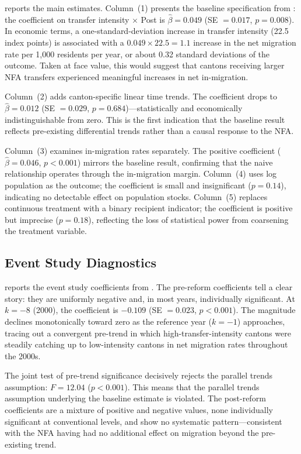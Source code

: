 \documentclass[12pt]{article}
\begin{document}
 reports the main estimates. Column~(1) presents the baseline specification from : the coefficient on transfer intensity $\times$ Post is $\hat{\beta} = 0.049$ (SE $= 0.017$, $p = 0.008$). In economic terms, a one-standard-deviation increase in transfer intensity (22.5 index points) is associated with a $0.049 \times 22.5 = 1.1$ increase in the net migration rate per 1,000 residents per year, or about 0.32 standard deviations of the outcome. Taken at face value, this would suggest that cantons receiving larger NFA transfers experienced meaningful increases in net in-migration.

Column~(2) adds canton-specific linear time trends. The coefficient drops to $\hat{\beta} = 0.012$ (SE $= 0.029$, $p = 0.684$)---statistically and economically indistinguishable from zero. This is the first indication that the baseline result reflects pre-existing differential trends rather than a causal response to the NFA.

Column~(3) examines in-migration rates separately. The positive coefficient ($\hat{\beta} = 0.046$, $p < 0.001$) mirrors the baseline result, confirming that the naive relationship operates through the in-migration margin. Column~(4) uses log population as the outcome; the coefficient is small and insignificant ($p = 0.14$), indicating no detectable effect on population stocks. Column~(5) replaces continuous treatment with a binary recipient indicator; the coefficient is positive but imprecise ($p = 0.18$), reflecting the loss of statistical power from coarsening the treatment variable.



\subsection{Event Study Diagnostics}

 reports the event study coefficients from . The pre-reform coefficients tell a clear story: they are uniformly negative and, in most years, individually significant. At $k = -8$ (2000), the coefficient is $-0.109$ (SE $= 0.023$, $p < 0.001$). The magnitude declines monotonically toward zero as the reference year ($k = -1$) approaches, tracing out a convergent pre-trend in which high-transfer-intensity cantons were steadily catching up to low-intensity cantons in net migration rates throughout the 2000s.

The joint test of pre-trend significance decisively rejects the parallel trends assumption: $F = 12.04$ ($p < 0.001$). This means that the parallel trends assumption underlying the baseline estimate is violated. The post-reform coefficients are a mixture of positive and negative values, none individually significant at conventional levels, and show no systematic pattern---consistent with the NFA having had no additional effect on migration beyond the pre-existing trend.
\end{document}
